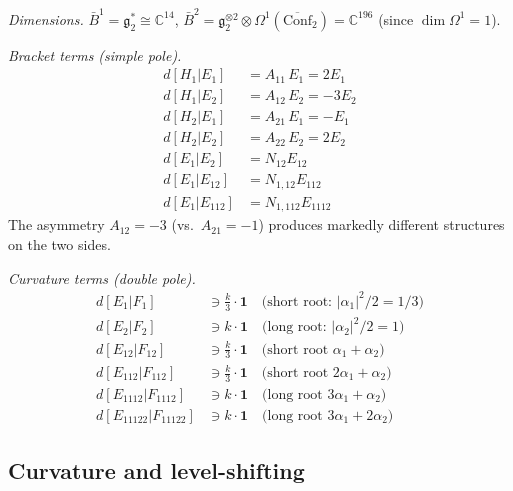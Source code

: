 \begin{computation}
\label{comp:G2-bar-deg2}

\emph{Dimensions.}
$\bar{B}^1 = \mathfrak{g}_2^* \cong \mathbb{C}^{14}$,
$\bar{B}^2 = \mathfrak{g}_2^{\otimes 2} \otimes
\Omega^1(\overline{\mathrm{Conf}}_2) = \mathbb{C}^{196}$
(since $\dim \Omega^1 = 1$).

\emph{Bracket terms (simple pole).}
\begin{align}
d[H_{1}|E_1] &= A_{11}\, E_1 = 2E_1 \\
d[H_{1}|E_2] &= A_{12}\, E_2 = -3E_2 \\
d[H_{2}|E_1] &= A_{21}\, E_1 = -E_1 \\
d[H_{2}|E_2] &= A_{22}\, E_2 = 2E_2 \\
d[E_1|E_2] &= N_{12}E_{12} \\
d[E_1|E_{12}] &= N_{1,12}E_{112} \\
d[E_1|E_{112}] &= N_{1,112}E_{1112}
\end{align}
The asymmetry $A_{12} = -3$ (vs.\ $A_{21} = -1$) produces
markedly different structures on the two sides.

\emph{Curvature terms (double pole).}
\begin{align}
d[E_1|F_1] &\ni \frac{k}{3}\cdot\mathbf{1}
 \quad\text{(short root: $|\alpha_1|^2/2 = 1/3$)} \\
d[E_2|F_2] &\ni k\cdot\mathbf{1}
 \quad\text{(long root: $|\alpha_2|^2/2 = 1$)} \\
d[E_{12}|F_{12}] &\ni \frac{k}{3}\cdot\mathbf{1}
 \quad\text{(short root $\alpha_1+\alpha_2$)} \\
d[E_{112}|F_{112}] &\ni \frac{k}{3}\cdot\mathbf{1}
 \quad\text{(short root $2\alpha_1+\alpha_2$)} \\
d[E_{1112}|F_{1112}] &\ni k\cdot\mathbf{1}
 \quad\text{(long root $3\alpha_1+\alpha_2$)} \\
d[E_{11122}|F_{11122}] &\ni k\cdot\mathbf{1}
 \quad\text{(long root $3\alpha_1+2\alpha_2$)}
\end{align}
\end{computation}

\subsection{Curvature and level-shifting}

